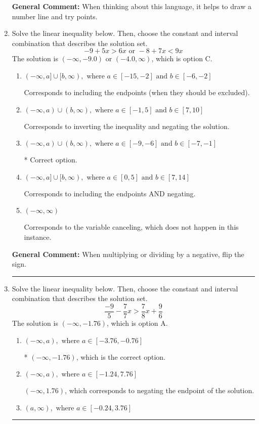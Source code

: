 \documentclass{extbook}[14pt]
\newcommand{\litem}[1]{\item #1

\rule{\textwidth}{0.4pt}}
\begin{document}
\begin{enumerate}
{\textbf{General Comment:} When thinking about this language, it helps to draw a number line and try points.
}
\litem{
Solve the linear inequality below. Then, choose the constant and interval combination that describes the solution set.
\[ -9 + 5 x > 6 x \text{ or } -8 + 7 x < 9 x \]
The solution is \( (-\infty, -9.0) \text{ or } (-4.0, \infty) \), which is option C.\begin{enumerate}[label=\Alph*.]
\item \( (-\infty, a] \cup [b, \infty), \text{ where } a \in [-15, -2] \text{ and } b \in [-6, -2] \)

Corresponds to including the endpoints (when they should be excluded).
\item \( (-\infty, a) \cup (b, \infty), \text{ where } a \in [-1, 5] \text{ and } b \in [7, 10] \)

Corresponds to inverting the inequality and negating the solution.
\item \( (-\infty, a) \cup (b, \infty), \text{ where } a \in [-9, -6] \text{ and } b \in [-7, -1] \)

 * Correct option.
\item \( (-\infty, a] \cup [b, \infty), \text{ where } a \in [0, 5] \text{ and } b \in [7, 14] \)

Corresponds to including the endpoints AND negating.
\item \( (-\infty, \infty) \)

Corresponds to the variable canceling, which does not happen in this instance.
\end{enumerate}

\textbf{General Comment:} When multiplying or dividing by a negative, flip the sign.
}
\litem{
Solve the linear inequality below. Then, choose the constant and interval combination that describes the solution set.
\[ \frac{-9}{5} - \frac{7}{7} x > \frac{7}{8} x + \frac{9}{6} \]
The solution is \( (-\infty, -1.76) \), which is option A.\begin{enumerate}[label=\Alph*.]
\item \( (-\infty, a), \text{ where } a \in [-3.76, -0.76] \)

* $(-\infty, -1.76)$, which is the correct option.
\item \( (-\infty, a), \text{ where } a \in [-1.24, 7.76] \)

 $(-\infty, 1.76)$, which corresponds to negating the endpoint of the solution.
\item \( (a, \infty), \text{ where } a \in [-0.24, 3.76] \)


\end{enumerate}}
\end{enumerate}
\end{document}
